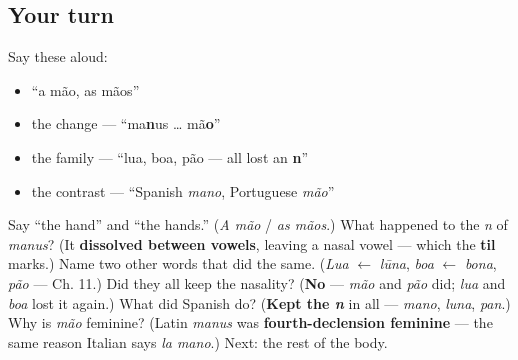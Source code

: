 \subsection*{Your turn}
Say these aloud:

\begin{itemize}
\raggedright
  \item \textquotedblleft{}a mão, as mãos\textquotedblright{}
  \item the change — \textquotedblleft{}ma\textbf{n}us … mã\textbf{o}\textquotedblright{}
  \item the family — \textquotedblleft{}lua, boa, pão — all lost an \textbf{n}\textquotedblright{}
  \item the contrast — \textquotedblleft{}Spanish \emph{mano}, Portuguese \emph{mão}\textquotedblright{}
\end{itemize}

\begin{tcolorbox}[breakable,colback=teal!4,colframe=teal!35!black,title={Before you move on}]
Say \textquotedblleft{}the hand\textquotedblright{} and \textquotedblleft{}the hands.\textquotedblright{} (\emph{A mão} / \emph{as mãos}.) What happened to the \emph{n} of \emph{manus}? (It \textbf{dissolved between vowels}, leaving a nasal vowel — which the \textbf{til} marks.) Name two other words that did the same. (\emph{Lua} $\leftarrow$ \emph{lūna}, \emph{boa} $\leftarrow$ \emph{bona}, \emph{pão} — Ch. 11.) Did they all keep the nasality? (\textbf{No} — \emph{mão} and \emph{pão} did; \emph{lua} and \emph{boa} lost it again.) What did Spanish do? (\textbf{Kept the \emph{n}} in all — \emph{mano}, \emph{luna}, \emph{pan}.) Why is \emph{mão} feminine? (Latin \emph{manus} was \textbf{fourth-declension feminine} — the same reason Italian says \emph{la mano}.) Next: the rest of the body.
\end{tcolorbox}
